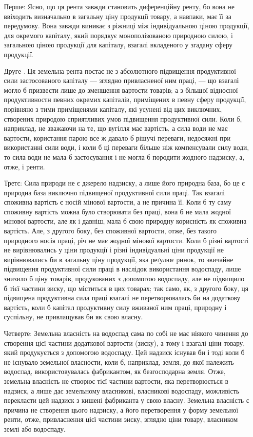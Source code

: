Перше: Ясно, що ця рента завжди становить диференційну ренту, бо
вона не ввіходить визначально в загальну ціну продукції товару, а навпаки,
має її за передумову. Вона завжди виникає з ріжниці між індивідуальною
ціною продукції, для окремого капіталу, який порядкує монополізованою природною
силою, і загальною ціною продукції для капіталу, взагалі вкладеного у згадану
сферу продукції.

Друге-. Ця земельна рента постає не з абсолютного підвищення продуктивної
сили застосованого капіталу — зглядно привласненої ним праці, —
що взагалі могло б призвести лише до зменшення вартости товарів; а
з більшої відносної продуктивностн певних окремих капіталів, приміщених
в певну сферу продукції, порівняно з тими приміщенями капіталу, які усунені
від цих виключних, створених природою сприятливих умов підвищення
продуктивної сили. Коли б, наприклад, не зважаючи на те, що вугілля має вартість,
а сила води не має вартости, користання парою все ж давало б рішучі
переваги, недосяжні при використанні сили води, і коли б ці переваги більше
ніж компенсували силу води, то сила води не мала б застосування і не могла б
породити жодного надзиску, а, отже, і ренти.

Третє: Сила природи не є джерело надзиску, а лише його природна
база, бо це є природна база виключно підвищеної продуктивної сили праці. Так
взагалі споживна вартість є носій мінової вартости, а не причина її. Коли б
ту саму споживну вартість можна було створювати без праці, вона б не мала
жодної мінової вартости, але як і давніш, мала б свою природну корисність
як споживна вартість. Але, з другого боку, без споживної вартости, отже,
без такого природного носія праці, річ не має жодної мінової вартости. Коли б
різні вартості не вирівнювались у ціни продукції і різні індивідуальні ціни
продукції не вирівнювались би в загальну ціну продукції, яка реґулює ринок,
то звичайне підвищення продуктивної сили праці в наслідок використання водоспаду,
лише знизило б ціну товарів, продукованих з допомогою водоспаду, але
не підвищило б тієї частини зиску, що міститься в цих товарах; так само, як,
з другого боку, ця підвищена продуктивна сила праці взагалі не перетворювалась
би на додаткову вартість, коли б капітал продуктивну силу вживаної ним
праці, природну і суспільну, не привлащував би як свою власну.

Четверте: Земельна власність на водоспад сама по собі не має ніякого
чинення до створення цієї частини додаткової вартости (зиску), а тому і взагалі
ціни товару, який продукується з допомогою водоспаду. Цей надзиск існував
би і тоді коли б не існувало земельної власности, коли б, наприклад,
земля, до якої належить водоспад, використовувалась фабрикантом, як безгосподарна
земля. Отже, земельна власність не створює тієї частини вартости,
яка перетворюється в надзиск, а лише дає земельному власникові, власникові
водоспаду, можливість перекласти цей надзиск з кишені фабриканта у свою
власну. Земельна власність є причина не створення цього надзиску, а його
перетворення у форму земельної ренти, отже, привласнення цієї частини зиску,
зглядно ціни товару, власником землі або водоспаду.

